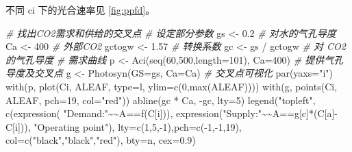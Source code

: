 \documentclass[
]{krantz}
\makeatletter
\newenvironment{Shaded}{\begin{snugshade}}{\end{snugshade}}
\newcommand{\AttributeTok}[1]{\textcolor[rgb]{0.77,0.63,0.00}{#1}}
\newcommand{\CommentTok}[1]{\textcolor[rgb]{0.56,0.35,0.01}{\textit{#1}}}
\newcommand{\DecValTok}[1]{\textcolor[rgb]{0.00,0.00,0.81}{#1}}
\newcommand{\ErrorTok}[1]{\textcolor[rgb]{0.64,0.00,0.00}{\textbf{#1}}}
\newcommand{\FloatTok}[1]{\textcolor[rgb]{0.00,0.00,0.81}{#1}}
\newcommand{\FunctionTok}[1]{\textcolor[rgb]{0.00,0.00,0.00}{#1}}
\newcommand{\NormalTok}[1]{#1}
\newcommand{\OtherTok}[1]{\textcolor[rgb]{0.56,0.35,0.01}{#1}}
\newcommand{\SpecialCharTok}[1]{\textcolor[rgb]{0.00,0.00,0.00}{#1}}
\newcommand{\StringTok}[1]{\textcolor[rgb]{0.31,0.60,0.02}{#1}}
\newenvironment{kframe}{%
\medskip{}
\setlength{\fboxsep}{.8em}
 \def\at@end@of@kframe{}%
 \ifinner\ifhmode%
  \def\at@end@of@kframe{\end{minipage}}%
  \begin{minipage}{\columnwidth}%
 \fi\fi%
 \def\FrameCommand##1{\hskip\@totalleftmargin \hskip-\fboxsep
 \colorbox{shadecolor}{##1}\hskip-\fboxsep
     \hskip-\linewidth \hskip-\@totalleftmargin \hskip\columnwidth}%
 \MakeFramed {\advance\hsize-\width
   \@totalleftmargin\z@ \linewidth\hsize
   \@setminipage}}%
 {\par\unskip\endMakeFramed%
 \at@end@of@kframe}
\renewenvironment{Shaded}{\begin{kframe}}{\end{kframe}}
\makeatother
\begin{document}
不同 ci 下的光合速率见 \ref{fig:ppfd}。

\begin{Shaded}
\begin{Highlighting}[]
\CommentTok{\# 找出CO2需求和供给的交叉点}
\CommentTok{\# 设定部分参数}
\NormalTok{gs }\OtherTok{\textless{}{-}} \FloatTok{0.2} \CommentTok{\# 对水的气孔导度}
\NormalTok{Ca }\OtherTok{\textless{}{-}} \DecValTok{400} \CommentTok{\# 外部CO2}
\NormalTok{gctogw }\OtherTok{\textless{}{-}} \FloatTok{1.57} \CommentTok{\# 转换系数}
\NormalTok{gc }\OtherTok{\textless{}{-}}\NormalTok{ gs }\SpecialCharTok{/}\NormalTok{ gctogw }\CommentTok{\# 对 CO2 的气孔导度}
\CommentTok{\# 需求曲线}
\NormalTok{p }\OtherTok{\textless{}{-}} \FunctionTok{Aci}\NormalTok{(}\FunctionTok{seq}\NormalTok{(}\DecValTok{60}\NormalTok{,}\DecValTok{500}\NormalTok{,}\AttributeTok{length=}\DecValTok{101}\NormalTok{), }\AttributeTok{Ca=}\DecValTok{400}\NormalTok{)}
\CommentTok{\# 提供气孔导度及交叉点}
\NormalTok{g }\OtherTok{\textless{}{-}} \FunctionTok{Photosyn}\NormalTok{(}\AttributeTok{GS=}\NormalTok{gs, }\AttributeTok{Ca=}\NormalTok{Ca)}
\CommentTok{\# 交叉点可视化}
\FunctionTok{par}\NormalTok{(}\AttributeTok{yaxs=}\StringTok{"i"}\NormalTok{)}
\FunctionTok{with}\NormalTok{(p, }\FunctionTok{plot}\NormalTok{(Ci, ALEAF, }\AttributeTok{type=}\StringTok{\textquotesingle{}l\textquotesingle{}}\NormalTok{, }
             \AttributeTok{ylim=}\FunctionTok{c}\NormalTok{(}\DecValTok{0}\NormalTok{,}\FunctionTok{max}\NormalTok{(ALEAF))))}
\FunctionTok{with}\NormalTok{(g, }\FunctionTok{points}\NormalTok{(Ci, ALEAF, }\AttributeTok{pch=}\DecValTok{19}\NormalTok{, }\AttributeTok{col=}\StringTok{"red"}\NormalTok{))}
\FunctionTok{abline}\NormalTok{(gc }\SpecialCharTok{*}\NormalTok{ Ca, }\SpecialCharTok{{-}}\NormalTok{gc, }\AttributeTok{lty=}\DecValTok{5}\NormalTok{)}
\FunctionTok{legend}\NormalTok{(}\StringTok{"topleft"}\NormalTok{, }\FunctionTok{c}\NormalTok{(}\FunctionTok{expression}\NormalTok{(}
  \StringTok{"Demand:"}\SpecialCharTok{\textasciitilde{}}\ErrorTok{\textasciitilde{}}\NormalTok{A}\SpecialCharTok{==}\FunctionTok{f}\NormalTok{(C[i])),}
   \FunctionTok{expression}\NormalTok{(}\StringTok{"Supply:"}\SpecialCharTok{\textasciitilde{}}\ErrorTok{\textasciitilde{}}\NormalTok{A}\SpecialCharTok{==}\NormalTok{g[c]}\SpecialCharTok{*}\NormalTok{(C[a]}\SpecialCharTok{{-}}\NormalTok{C[i])),}
              \StringTok{"Operating point"}\NormalTok{),}
   \AttributeTok{lty=}\FunctionTok{c}\NormalTok{(}\DecValTok{1}\NormalTok{,}\DecValTok{5}\NormalTok{,}\SpecialCharTok{{-}}\DecValTok{1}\NormalTok{),}\AttributeTok{pch=}\FunctionTok{c}\NormalTok{(}\SpecialCharTok{{-}}\DecValTok{1}\NormalTok{,}\SpecialCharTok{{-}}\DecValTok{1}\NormalTok{,}\DecValTok{19}\NormalTok{),}
   \AttributeTok{col=}\FunctionTok{c}\NormalTok{(}\StringTok{"black"}\NormalTok{,}\StringTok{"black"}\NormalTok{,}\StringTok{"red"}\NormalTok{),}
   \AttributeTok{bty=}\StringTok{\textquotesingle{}n\textquotesingle{}}\NormalTok{, }\AttributeTok{cex=}\FloatTok{0.9}\NormalTok{)}
\end{Highlighting}
\end{Shaded}
\end{document}
